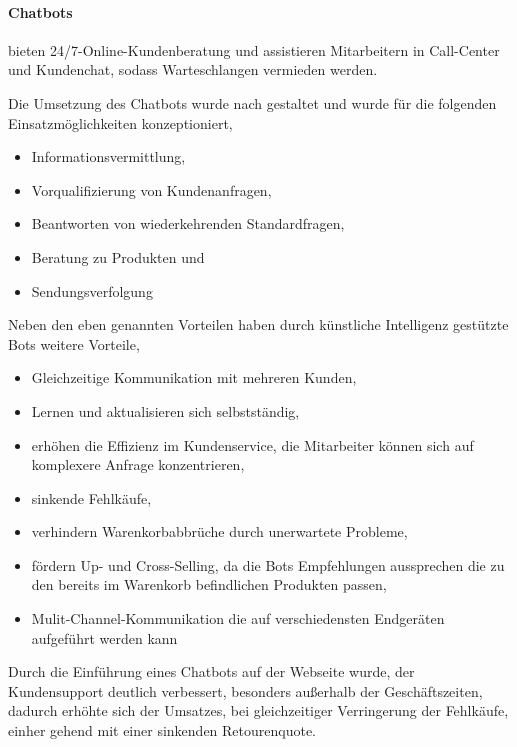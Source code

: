 \paragraph{Chatbots} bieten 24/7-Online-Kun\-den\-be\-ra\-tung und assistieren Mitarbeitern in Call-Center und Kundenchat, sodass Warteschlangen vermieden werden.\vspace{0.2cm}

Die Umsetzung des Chatbots wurde nach \cite{chatlogue_chatbot_tasks} gestaltet und wurde für die folgenden Einsatzmöglichkeiten konzeptioniert,

\begin{itemize}
	\item Informationsvermittlung,
	\item Vorqualifizierung von Kundenanfragen,
	\item Beantworten von wiederkehrenden Standardfragen,
	\item Beratung zu Produkten und
	\item Sendungsverfolgung
\end{itemize} 

Neben den eben genannten Vorteilen haben durch künstliche Intelligenz gestützte Bots weitere Vorteile,

\begin{itemize}
	\item Gleichzeitige Kommunikation mit mehreren Kunden,
	\item Lernen und aktualisieren sich selbstständig,
	\item erhöhen die Effizienz im Kundenservice, die Mitarbeiter können sich auf komplexere Anfrage konzentrieren,
	\item sinkende Fehlkäufe,
	\item verhindern Warenkorbabbrüche durch unerwartete Probleme,
	\item fördern Up- und Cross-Selling, da die Bots Empfehlungen aussprechen die zu den bereits im Warenkorb befindlichen Produkten passen,
	\item Mulit-Channel-Kommunikation die auf verschiedensten Endgeräten aufgeführt werden kann 
\end{itemize}

Durch die Einführung eines Chatbots auf der Webseite wurde, der Kundensupport deutlich verbessert, besonders außerhalb der Geschäftszeiten, dadurch erhöhte sich der Umsatzes, bei gleichzeitiger Verringerung der Fehlkäufe, einher gehend mit einer sinkenden Retourenquote.\vspace{0.2cm}

